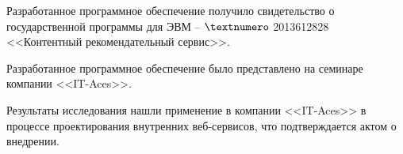 Разработанное программное обеспечение получило свидетельство
о государственной программы для ЭВМ – $\textnumero$ 2013612828 <<Контентный
рекомендательный сервис>>.

Разработанное программное обеспечение было представлено
на семинаре компании <<IT-Aces>>.

Результаты исследования нашли применение в компании
<<IT-Aces>> в процессе проектирования внутренних веб-сервисов, что
подтверждается актом о внедрении.

%

